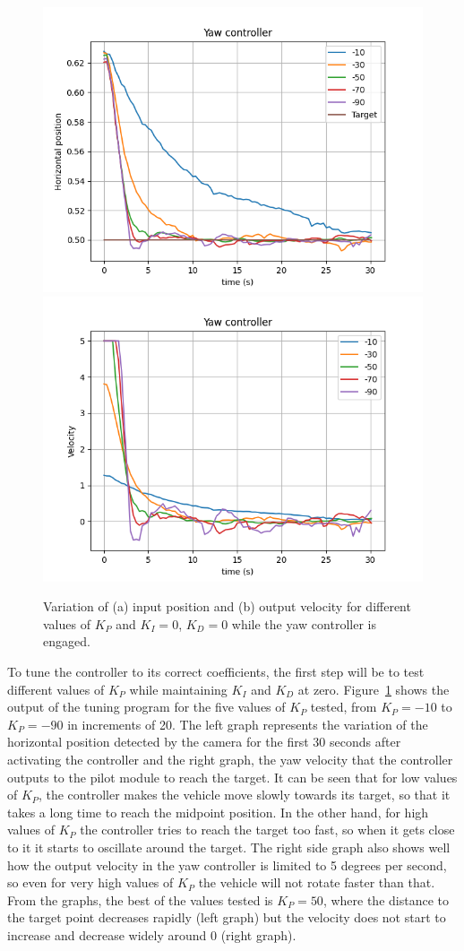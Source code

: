\begin{figure}
  \centering
  \includegraphics[width=.45\linewidth]{img/pid/yaw/yaw_pos_prop_i0_d0.png}
  \includegraphics[width=.45\linewidth]{img/pid/yaw/yaw_vel_prop_i0_d0.png}
  \caption{Variation of (a) input position and (b) output velocity for different values of $K_{P}$ and $K_I=0$, $K_D=0$ while the yaw controller is engaged.}\label{fig:tune-yaw-prop}
\end{figure}

To tune the controller to its correct coefficients, the first step will be to test different values of $K_{P}$ while maintaining $K_{I}$ and $K_{D}$ at zero.
Figure~\ref{fig:tune-yaw-prop} shows the output of the tuning program for the five values of $K_{P}$ tested, from $K_P=-10$ to $K_P=-90$ in increments of 20.
The left graph represents the variation of the horizontal position detected by the camera for the first 30 seconds after activating the controller and the right graph, the yaw velocity that the controller outputs to the pilot module to reach the target.
It can be seen that for low values of $K_{P}$, the controller makes the vehicle move slowly towards its target, so that it takes a long time to reach the midpoint position.
In the other hand, for high values of $K_{P}$ the controller tries to reach the target too fast, so when it gets close to it it starts to oscillate around the target.
The right side graph also shows well how the output velocity in the yaw controller is limited to 5 degrees per second, so even for very high values of $K_P$ the vehicle will not rotate faster than that.
From the graphs, the best of the values tested is $K_{P}=50$, where the distance to the target point decreases rapidly (left graph) but the velocity does not start to increase and decrease widely around 0 (right graph).

